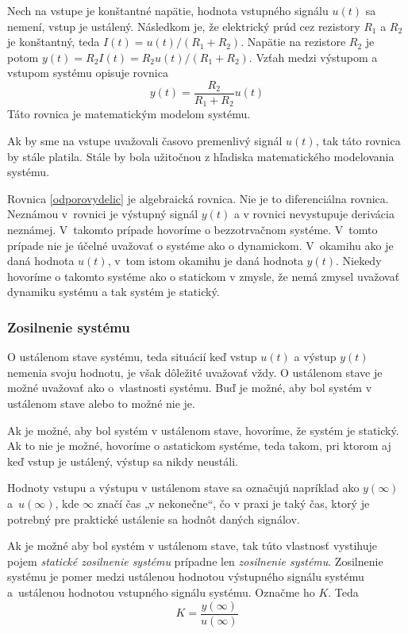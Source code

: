 \documentclass[a4paper, 10pt, ]{article}
\begin{document}
Nech na vstupe je konštantné napätie, hodnota vstupného signálu $u(t)$  sa nemení, vstup je ustálený. Následkom je, že elektrický prúd cez rezistory $R_1$ a $R_2$ je konštantný, teda $I(t) = u(t) / (R_1 + R_2)$. Napätie na rezistore $R_2$ je potom $y(t) = R_2 I(t) = R_2 u(t) / (R_1 + R_2)$. Vzťah medzi výstupom a vstupom systému opisuje rovnica
\begin{equation} \label{odporovydelic}
    y(t) = \frac{R_2}{R_1 + R_2} u(t)
\end{equation}
Táto rovnica je matematickým modelom systému.

Ak by sme na vstupe uvažovali časovo premenlivý signál $u(t)$, tak táto rovnica by stále platila. Stále by bola užitočnou z hľadiska matematického modelovania systému. 

Rovnica \eqref{odporovydelic} je algebraická rovnica. Nie je to diferenciálna rovnica. Neznámou v~rovnici je výstupný signál $y(t)$ a v rovnici nevystupuje derivácia neznámej. V~takomto prípade hovoríme o bezzotrvačnom systéme. V~tomto prípade nie je účelné uvažovať o systéme ako o dynamickom. V~okamihu ako je daná hodnota $u(t)$, v~tom istom okamihu je daná hodnota $y(t)$. Niekedy hovoríme o takomto systéme ako o statickom v zmysle, že nemá zmysel uvažovať dynamiku systému a tak systém je statický.

\subsubsection{Zosilnenie systému}

O ustálenom stave systému, teda situácií keď vstup $u(t)$ a výstup $y(t)$ nemenia svoju hodnotu, je však dôležité uvažovať vždy. O ustálenom stave je možné uvažovať ako o~vlastnosti systému. Buď je možné, aby bol systém v ustálenom stave alebo to možné nie je.

Ak je možné, aby bol systém v ustálenom stave, hovoríme, že systém je statický. Ak to nie je možné, hovoríme o astatickom systéme, teda takom, pri ktorom aj keď vstup je ustálený, výstup sa nikdy neustáli.

Hodnoty vstupu a výstupu v ustálenom stave sa označujú napríklad ako $y(\infty)$ a~$u(\infty)$, kde $\infty$ značí čas „v nekonečne“, čo v praxi je taký čas, ktorý je potrebný pre praktické ustálenie sa hodnôt daných signálov.

Ak je možné aby bol systém v ustálenom stave, tak túto vlastnosť vystihuje pojem \emph{statické zosilnenie systému} prípadne len \emph{zosilnenie systému}. Zosilnenie systému je pomer medzi ustálenou hodnotou výstupného signálu systému a~ustálenou hodnotou vstupného signálu systému. Označme ho $K$. Teda
\begin{equation}
    K = \frac{y(\infty)}{u(\infty)}
\end{equation}
\end{document}
